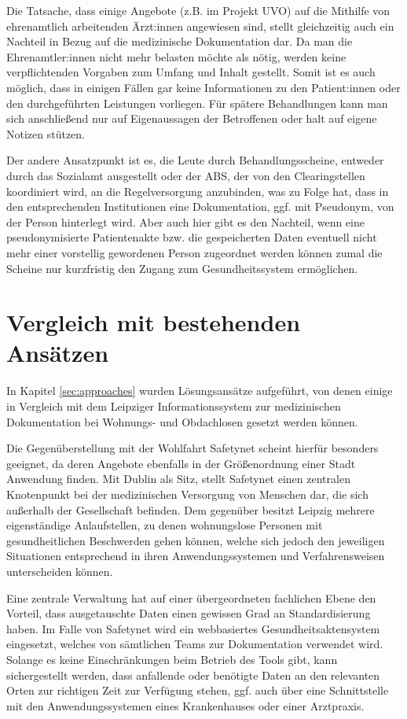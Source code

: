 Die Tatsache, dass einige Angebote (z.B. im Projekt \ac{UVO}) auf die Mithilfe von ehrenamtlich arbeitenden Ärzt:innen angewiesen sind, stellt gleichzeitig auch ein Nachteil in Bezug auf die medizinische Dokumentation dar. Da man die Ehrenamtler:innen nicht mehr belasten möchte als nötig, werden keine verpflichtenden Vorgaben zum Umfang und Inhalt gestellt. Somit ist es auch möglich, dass in einigen Fällen gar keine Informationen zu den Patient:innen oder den durchgeführten Leistungen vorliegen. Für spätere Behandlungen kann man sich anschließend nur auf Eigenaussagen der Betroffenen oder halt auf eigene Notizen stützen.

Der andere Ansatzpunkt ist es, die Leute durch Behandlungsscheine, entweder durch das Sozialamt ausgestellt oder der \ac{ABS}, der von den Clearingstellen koordiniert wird, an die Regelversorgung anzubinden, was zu Folge hat, dass in den entsprechenden Institutionen eine Dokumentation, ggf. mit Pseudonym, von der Person hinterlegt wird. Aber auch hier gibt es den Nachteil, wenn eine pseudonymisierte Patientenakte bzw. die gespeicherten Daten eventuell nicht mehr einer vorstellig gewordenen Person zugeordnet werden können zumal die Scheine nur kurzfristig den Zugang zum Gesundheitssystem ermöglichen.


\section{Vergleich mit bestehenden Ansätzen}

In Kapitel \ref{sec:approaches} wurden Lösungsansätze aufgeführt, von denen einige in Vergleich mit dem Leipziger Informationssystem zur medizinischen Dokumentation bei Wohnungs- und Obdachlosen gesetzt werden können.

Die Gegenüberstellung mit der Wohlfahrt Safetynet scheint hierfür besonders geeignet, da deren Angebote ebenfalls in der Größenordnung einer Stadt Anwendung finden. Mit Dublin als Sitz, stellt Safetynet einen zentralen Knotenpunkt bei der medizinischen Versorgung von Menschen dar, die sich außerhalb der Gesellschaft befinden. Dem gegenüber besitzt Leipzig mehrere eigenständige Anlaufstellen, zu denen wohnungslose Personen mit gesundheitlichen Beschwerden gehen können, welche sich jedoch den jeweiligen Situationen entsprechend in ihren Anwendungssystemen und Verfahrensweisen unterscheiden können.

Eine zentrale Verwaltung hat auf einer übergeordneten fachlichen Ebene den Vorteil, dass ausgetauschte Daten einen gewissen Grad an Standardisierung haben. Im Falle von Safetynet wird ein webbasiertes Gesundheitsaktensystem eingesetzt, welches von sämtlichen Teams zur Dokumentation verwendet wird. Solange es keine Einschränkungen beim Betrieb des Tools gibt, kann sichergestellt werden, dass anfallende oder benötigte Daten an den relevanten Orten zur richtigen Zeit zur Verfügung stehen, ggf. auch über eine Schnittstelle mit den Anwendungssystemen eines Krankenhauses oder einer Arztpraxis.

